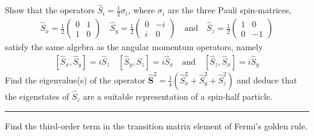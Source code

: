 \begin{problem}{2.16}
Show that the operators $\hat{S}_i = \frac{1}{2}\sigma_i$, where $\sigma_i$ are the three Pauli spin-matrices,
\begin{align*}
    \hat{S}_x = \frac{1}{2} \begin{pmatrix}
        0 & 1 \\
        1 & 0 
    \end{pmatrix} \quad 
    \hat{S}_y = \frac{1}{2} \begin{pmatrix}
        0 & -i \\
        i & 0 
    \end{pmatrix} \quad \text{and} \quad 
    \hat{S}_z = \frac{1}{2} \begin{pmatrix}
        1 & 0 \\
        0 & -1 
    \end{pmatrix}
\end{align*}
satisfy the same algebra as the angular momentum operators, namely
\begin{align*}
    \left[ \hat{S}_x, \hat{S}_y \right] = i \hat{S}_z \quad \left[ \hat{S}_y, \hat{S}_z \right] = i \hat{S}_x \quad \text{and} \quad \left[ \hat{S}_z, \hat{S}_x \right] = i \hat{S}_y
\end{align*}
Find the eigenvalue(s) of the operator $\hat{\mathbf{S}}^2 = \frac{1}{4} \left( \hat{S}_x^2 + \hat{S}_y^2 + \hat{S}_z^2 \right)$ and deduce that the eigenstates of $\hat{S}_z$ are a suitable representation of a spin-half particle.
\end{problem}
\begin{solution}
            
\end{solution}
    
\noindent\rule{7in}{1.5pt}




\begin{problem}{2.17}
Find the third-order term in the transition matrix element of Fermi's golden rule.
\end{problem}
\begin{solution}
        
\end{solution} 
